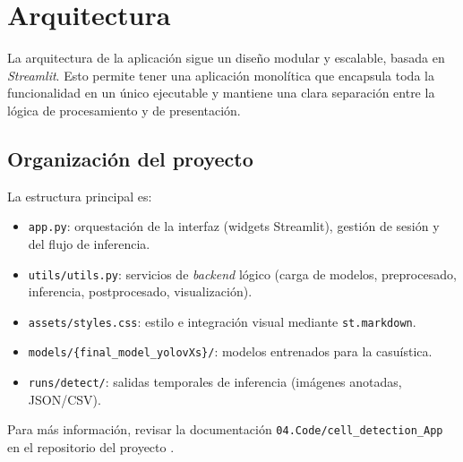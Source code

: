 \documentclass[12pt,a4paper,onecolumn,oneside]{report}
\begin{document}
\section{Arquitectura}
\label{sec:Arquitectura}
La arquitectura de la aplicación sigue un diseño modular y escalable, basada en \textit{Streamlit}. Esto permite tener una aplicación monolítica que encapsula toda la funcionalidad en un único ejecutable y mantiene 
una clara separación entre la lógica de procesamiento y de presentación.

\subsection{Organización del proyecto}
La estructura principal es:
\begin{itemize}
  \item \texttt{app.py}: orquestación de la interfaz (widgets Streamlit), gestión de sesión y del flujo de inferencia.
  \item \texttt{utils/utils.py}: servicios de \textit{backend} lógico (carga de modelos, preprocesado, inferencia, postprocesado, visualización).
  \item \texttt{assets/styles.css}: estilo e integración visual mediante \texttt{st.markdown}.
  \item \texttt{models/\{final\_model\_yolovXs\}/}: modelos entrenados para la casuística.
  \item \texttt{runs/detect/}: salidas temporales de inferencia (imágenes anotadas, JSON/CSV).
\end{itemize}

Para más información, revisar la documentación \texttt{04.Code/cell\_detection\_App} en el repositorio del proyecto \cite{repoTFM}.
\end{document}
